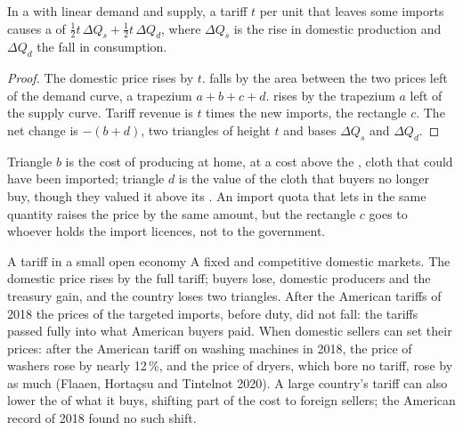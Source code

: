 \begin{proposition}\label{prop:g12:trade-and-trade-policy:tariff}
In a  with linear demand and supply, a tariff $t$ per unit that leaves some imports causes a  of $\tfrac12 t\,\Delta Q_s + \tfrac12 t\,\Delta Q_d$,
where $\Delta Q_s$ is the rise in domestic production and $\Delta Q_d$ the fall in consumption.
\end{proposition}
\begin{proof}
The domestic price rises by $t$.  falls by the area between the two prices left of the demand curve, a trapezium $a + b + c + d$.  rises by
the trapezium $a$ left of the supply curve. Tariff revenue is $t$ times the new imports, the rectangle $c$. The net change is $-(b + d)$, two triangles of height $t$ and
bases $\Delta Q_s$ and $\Delta Q_d$.
\end{proof}

Triangle $b$ is the cost of producing at home, at a cost above the , cloth that could have been imported; triangle $d$ is the value of the cloth that buyers no
longer buy, though they valued it above its . An import quota that lets in the same quantity raises the price by the same amount, but the rectangle $c$ goes to
whoever holds the import licences, not to the government.

\begin{model}{A tariff in a small open economy}
\assumes A fixed  and competitive domestic markets.
\predicts The domestic price rises by the full tariff; buyers lose, domestic producers and the treasury gain, and the country loses two triangles.
\tested After the American tariffs of 2018 the prices of the targeted imports, before duty, did not fall: the tariffs passed fully into what American buyers paid.
\breaks When domestic sellers can set their prices: after the American tariff on washing machines in 2018, the price of washers rose by nearly 12\,\%, and the
  price of dryers, which bore no tariff, rose by as much (Flaaen, Hortaçsu and Tintelnot 2020). A large country's tariff can also lower the
   of what it buys, shifting part of the cost to foreign sellers; the American record of 2018 found no such shift.
\end{model}

